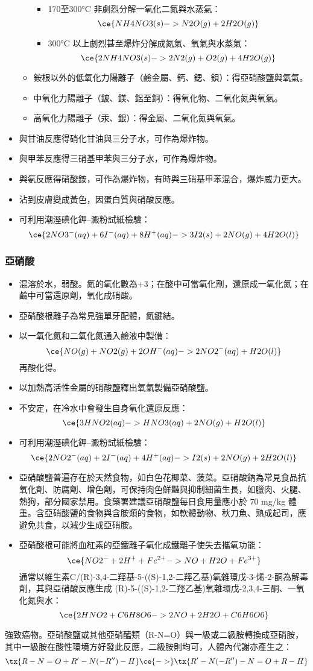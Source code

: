 \documentclass[a4paper,12pt]{report}
\begin{document}
\begin{itemize}
\begin{itemize}
\begin{itemize}
\item 170至300°C 非劇烈分解一氧化二氮與水蒸氣：
\[\ce{NH4NO3(s) -> N2O(g) + 2H2O(g)}\]
\item 300°C 以上劇烈甚至爆炸分解成氮氣、氧氣與水蒸氣：
\[\ce{2NH4NO3(s) -> 2N2(g) + O2(g) + 4H2O(g)}\]
\end{itemize}
\item 銨根以外的低氧化力陽離子（鹼金屬、鈣、鍶、鋇）：得亞硝酸鹽與氧氣。
\item 中氧化力陽離子（鈹、鎂、鋁至銅）：得氧化物、二氧化氮與氧氣。
\item 高氧化力陽離子（汞、銀）：得金屬、二氧化氮與氧氣。
\end{itemize}
\item 與甘油反應得硝化甘油與三分子水，可作為爆炸物。
\item 與甲苯反應得三硝基甲苯與三分子水，可作為爆炸物。
\item 與氨反應得硝酸銨，可作為爆炸物，有時與三硝基甲苯混合，爆炸威力更大。
\item 沾到皮膚變成黃色，因蛋白質與硝酸反應。
\item 可利用潮溼碘化鉀–澱粉試紙檢驗：
\[\ce{2NO3^-(aq) + 6I^-(aq) + 8H^+(aq) -> 3I2(s) + 2NO(g) + 4H2O(l)}\]
\end{itemize}
\subsubsection{亞硝酸}
\begin{itemize}
\item 混溶於水，弱酸。氮的氧化數為+3；在酸中可當氧化劑，還原成一氧化氮；在鹼中可當還原劑，氧化成硝酸。
\item 亞硝酸根離子為常見強單牙配體，氮鍵結。
\item 以一氧化氮和二氧化氮通入鹼液中製備：
\[\ce{NO(g) + NO2(g) + 2OH^-(aq) -> 2NO2^-(aq) + H2O(l)}\]
再酸化得。
\item 以加熱高活性金屬的硝酸鹽釋出氧氣製備亞硝酸鹽。
\item 不安定，在冷水中會發生自身氧化還原反應：
\[\ce{3HNO2(aq) -> HNO3(aq) + 2NO(g) + H2O(l)}\]
\item 可利用潮溼碘化鉀–澱粉試紙檢驗：
\[\ce{2NO2^-(aq) + 2I^-(aq) + 4H^+(aq) -> I2(s) + 2NO(g) + 2H2O(l)}\]
\item 亞硝酸鹽普遍存在於天然食物，如白色花椰菜、菠菜。亞硝酸鈉為常見食品抗氧化劑、防腐劑、增色劑，可保持肉色鮮豔與抑制細菌生長，如臘肉、火腿、熱狗，部分國家禁用。食藥署建議亞硝酸鹽每日食用量應小於 70 mg/kg 體重。含亞硝酸鹽的食物與含胺類的食物，如軟體動物、秋刀魚、熟成起司，應避免共食，以減少生成亞硝胺。
\item 亞硝酸根可能將血紅素的亞鐵離子氧化成鐵離子使失去攜氧功能：
\[\ce{NO2^- + 2H^+ + Fe^{2+} -> NO + H2O + Fe^{3+}}\]
通常以維生素C/(R)-3,4-二羥基-5-((S)-1,2-二羥乙基)氧雜環戊-3-烯-2-酮為解毒劑，其與亞硝酸反應生成 (R)-5-((S)-1,2-二羥乙基)氧雜環戊-2,3,4-三酮、一氧化氮與水：
\[\ce{2HNO2 + C6H8O6 -> 2NO + 2H2O + C6H6O6}\]
\end{itemize}
強致癌物。亞硝酸鹽或其他亞硝醯類（R-N=O）與一級或二級胺轉換成亞硝胺，其中一級胺在酸性環境方好發此反應，二級胺則均可，人體內代謝亦產生之：
\[\tx{R-N=O + R'-N(-R'')-H}\ce{->}\tx{R'-N(-R'')-N=O + R-H}\]
\end{document}

